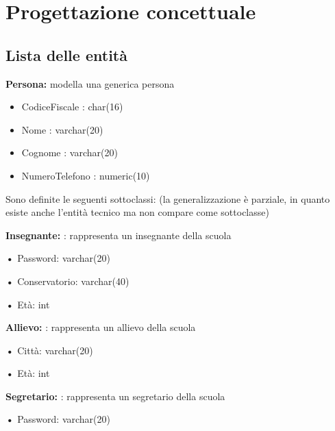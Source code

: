 \documentclass{article}
\begin{document}
\newpage
\section{Progettazione concettuale}

\subsection{Lista delle entità}


\textbf{Persona: }modella una generica persona


\begin{itemize}
	\item CodiceFiscale : char(16)
	\item Nome : varchar(20)
	\item Cognome : varchar(20)
	\item NumeroTelefono : numeric(10)
\end{itemize}




\begin{flushleft}
Sono definite le seguenti sottoclassi: (la generalizzazione è parziale, in quanto esiste anche l'entità tecnico ma non compare come sottoclasse)\\
\end{flushleft}


\textbf{Insegnante: }: rappresenta un insegnante della scuola

\begin{description} 
	\item \hspace{2em} \textbf{•} Password: varchar(20)
	\item \hspace{2em} \textbf{•} Conservatorio: varchar(40)
	\item \hspace{2em} \textbf{•} Età: int
\end{description}

\textbf{Allievo: }: rappresenta un allievo della scuola

\begin{description} 
	\item \hspace{2em} \textbf{•} Città: varchar(20)
	\item \hspace{2em} \textbf{•} Età: int
\end{description}

\textbf{Segretario: }: rappresenta un segretario della scuola
\begin{description}
	\item \hspace{2em} \textbf{•} Password: varchar(20)
\end{description}
\end{document}
